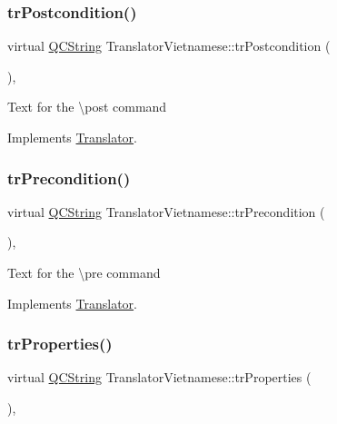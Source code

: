 \subsubsection{\texorpdfstring{trPostcondition()}{trPostcondition()}}
{\footnotesize\ttfamily virtual \mbox{\hyperlink{class_q_c_string}{Q\+C\+String}} Translator\+Vietnamese\+::tr\+Postcondition (\begin{DoxyParamCaption}{ }\end{DoxyParamCaption})\hspace{0.3cm}{\ttfamily [inline]}, {\ttfamily [virtual]}}

Text for the \textbackslash{}post command 

Implements \mbox{\hyperlink{class_translator}{Translator}}.

\mbox{\label{class_translator_vietnamese_a59f792e56029f846a054570019272204}} 
\subsubsection{\texorpdfstring{trPrecondition()}{trPrecondition()}}
{\footnotesize\ttfamily virtual \mbox{\hyperlink{class_q_c_string}{Q\+C\+String}} Translator\+Vietnamese\+::tr\+Precondition (\begin{DoxyParamCaption}{ }\end{DoxyParamCaption})\hspace{0.3cm}{\ttfamily [inline]}, {\ttfamily [virtual]}}

Text for the \textbackslash{}pre command 

Implements \mbox{\hyperlink{class_translator}{Translator}}.

\mbox{\label{class_translator_vietnamese_a64d14a88394a09d71d08598c3b49243a}} 
\subsubsection{\texorpdfstring{trProperties()}{trProperties()}}
{\footnotesize\ttfamily virtual \mbox{\hyperlink{class_q_c_string}{Q\+C\+String}} Translator\+Vietnamese\+::tr\+Properties (\begin{DoxyParamCaption}{ }\end{DoxyParamCaption})\hspace{0.3cm}{\ttfamily [inline]}, {\ttfamily [virtual]}}

